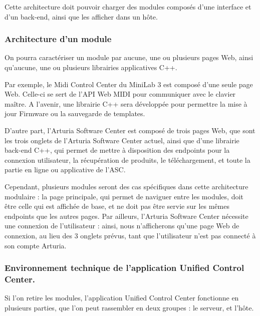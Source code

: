 \documentclass[francais]{rapportPFE}  %
\begin{document}
Cette architecture doit pouvoir charger des modules composés d'une interface et d'un back-end, ainsi que les afficher dans un hôte.

\subsubsection{Architecture d'un module}

On pourra caractériser un module par aucune, une ou plusieurs pages Web, ainsi qu'aucune, une ou plusieurs librairies applicatives C++.

Par exemple, le Midi Control Center du MiniLab 3 est composé d'une seule page Web. Celle-ci se sert de l'API Web MIDI pour communiquer avec le clavier maître. A l'avenir, une librairie C++ sera développée pour permettre la mise à jour Firmware ou la sauvegarde de templates.

D'autre part, l'Arturia Software Center est composé de trois pages Web, que sont les trois onglets de l'Arturia Software Center actuel, ainsi que d'une librairie back-end C++, qui permet de mettre à disposition des endpoints pour la connexion utilisateur, la récupération de produits, le téléchargement, et toute la partie en ligne ou applicative de l'ASC.

Cependant, plusieurs modules seront des cas spécifiques dans cette architecture modulaire :
la page principale, qui permet de naviguer entre les modules, doit être celle qui est affichée de base, et ne doit pas être servie sur les mêmes endpoints que les autres pages.
Par ailleurs, l'Arturia Software Center nécessite une connexion de l'utilisateur : ainsi, nous n'afficherons qu'une page Web de connexion, au lieu des 3 onglets prévus, tant que l'utilisateur n'est pas connecté à son compte Arturia.



\subsubsection{Environnement technique de l'application Unified Control Center.}

Si l'on retire les modules, l'application Unified Control Center fonctionne en plusieurs parties, que l'on peut rassembler en deux groupes : le serveur, et l'hôte.
\end{document}
